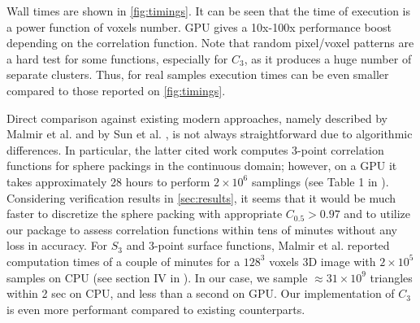 \documentclass[reprint,amsmath,amssymb,aps,pre,showkeys,showpacs]{revtex4-1}
\begin{document}
Wall times are shown in \cref{fig:timings}. It can be seen that the time of
execution is a power function of voxels number. GPU gives a
10x-100x performance boost depending on the correlation function. Note that
random pixel/voxel patterns are a hard test for some functions, especially for
$C_3$, as it produces a huge number of separate clusters. Thus, for real samples
execution times can be even smaller compared to those reported on \cref{fig:timings}.

Direct comparison against existing modern approaches, namely described by Malmir
et al. \cite{malmir2018} and by Sun et al. \cite{sun2022third}, is not always
straightforward due to algorithmic differences.  In particular, the latter cited
work computes 3-point correlation functions for sphere packings in the
continuous domain; however, on a GPU it takes approximately 28 hours to perform
$2\times10^6$ samplings (see Table 1 in \cite{sun2022third}).  Considering
verification results in \cref{sec:results}, it seems that it would be much
faster to discretize the sphere packing with appropriate $C_{0.5} > 0.97$ and to
utilize our package to assess correlation functions within tens of minutes
without any loss in accuracy.  For $S_3$ and 3-point surface functions, Malmir
et al. reported computation times of a couple of minutes for a $128^3$ voxels 3D
image with $2\times10^5$ samples on CPU (see section IV in \cite{malmir2018}).
In our case, we sample $\approx 31\times10^9$ triangles within 2 sec on CPU, and
less than a second on GPU.  Our implementation of $C_3$ is even more performant
compared to existing counterparts.
\end{document}
